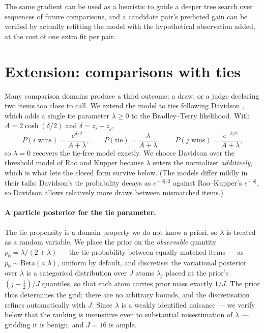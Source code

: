 \documentclass[12pt]{article}
\begin{document}
The same gradient can be used as a heuristic to guide a deeper tree search over sequences of
future comparisons, and a candidate pair's predicted gain can be verified by actually refitting
the model with the hypothetical observation added, at the cost of one extra fit per pair.

\section{Extension: comparisons with ties}
\label{sec:ties}

Many comparison domains produce a third outcome: a draw, or a judge declaring two items too close
to call. We extend the model to ties following Davidson \cite{davidson1970ties}, which adds a
single tie parameter $\lambda \ge 0$ to the Bradley--Terry likelihood. With
$A = 2\cosh(\delta/2)$ and $\delta = z_i - z_j$,
\begin{equation*}
    P(i \text{ wins}) = \frac{e^{\delta/2}}{A + \lambda}, \qquad
    P(\text{tie}) = \frac{\lambda}{A + \lambda}, \qquad
    P(j \text{ wins}) = \frac{e^{-\delta/2}}{A + \lambda},
\end{equation*}
so $\lambda = 0$ recovers the tie-free model exactly. We choose Davidson over the
threshold model of Rao and Kupper \cite{rao1967ties} because $\lambda$ enters the normalizer
\emph{additively}, which is what lets the closed form survive below. (The models differ mildly in
their tails: Davidson's tie probability decays as $e^{-|\delta|/2}$ against Rao--Kupper's
$e^{-|\delta|}$, so Davidson allows relatively more draws between mismatched items.)

\paragraph{A particle posterior for the tie parameter.}
The tie propensity is a domain property we do not know a priori, so $\lambda$ is treated as a
random variable. We place the prior on the \emph{observable} quantity
$p_0 = \lambda/(2+\lambda)$ --- the tie probability between equally matched items --- as
$p_0 \sim \mathrm{Beta}(a, b)$, uniform by default, and discretise: the variational posterior
over $\lambda$ is a categorical distribution over $J$ atoms $\lambda_j$ placed at the prior's
$(j-\tfrac12)/J$ quantiles, so that each atom carries prior mass exactly $1/J$. The prior thus
determines the grid; there are no arbitrary bounds, and the discretisation refines automatically
with $J$. Since $\lambda$ is a weakly identified nuisance --- we verify below that the ranking is
insensitive even to substantial misestimation of $\lambda$ --- gridding it is benign, and $J = 16$
is ample.
\end{document}
